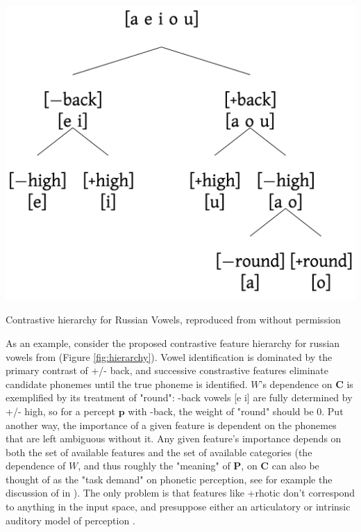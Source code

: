 \begin{marginfigure}
\includegraphics[width=\linewidth]{modeling/figures/russian_vowel_hierarchy.png}
\caption{Contrastive hierarchy for Russian Vowels, reproduced from \citep{iosadVowelReductionRussian2012} without permission}
\label{fig:hierarchy}
\end{marginfigure}

As an example, consider the proposed contrastive feature hierarchy for russian vowels from \citep{iosadVowelReductionRussian2012} (Figure \ref{fig:hierarchy}). Vowel identification is dominated by the primary contrast of +/- back, and successive constrastive features eliminate candidate phonemes until the true phoneme is identified. $W$'s dependence on $\mathbf{C}$ is exemplified by its treatment of "round": -back vowels [e i] are fully determined by +/- high, so for a percept $\mathbf{p}$ with -back, the weight of "round" should be 0. Put another way, the importance of a given feature is dependent on the phonemes that are left ambiguous without it. Any given feature's importance depends on both the set of available features and the set of available categories (the dependence of $W$, and thus roughly the "meaning" of $\mathbf{P}$, on $\mathbf{C}$ can also be thought of as the "task demand" on phonetic perception, see for example the discussion of \citep{leeExtendingALCOVEModel2002} in \citep{navarroDevilDeepBlue2019}). The only problem is that features like +rhotic don't correspond to anything in the input space, and presuppose either an articulatory or intrinsic auditory model of perception \citep{lindauStory1980}. 

